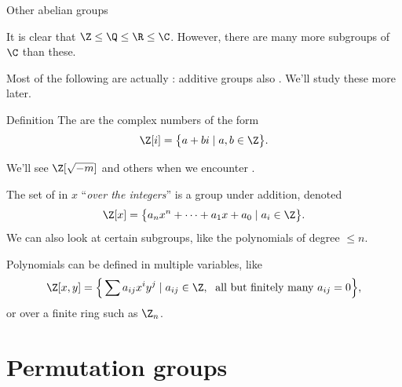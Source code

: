 \documentclass[8pt, handout]{beamer}
\newcommand{\Pause}{}
\begin{document}
\begin{frame}{Other abelian groups}
  
  It is clear that $\Z\leq\Q\leq\R\leq\C$. \Pause However, there are
  many more subgroups of $\C$ than these. \medskip\Pause

  Most of the following are actually : additive groups
  also . We'll study
  these more later. \smallskip\pause
  
  \begin{block}{Definition}
  The  are the complex numbers of the form
  \[
  \Z[i]=\big\{a+bi\mid a,b\in\Z\big\}.
  \]
  \end{block}

  \smallskip\Pause
  
  We'll see $\Z[\sqrt{-m}]$ and others when we encounter .  \medskip\pause

  The set of  in $x$ ``\emph{over the integers}'' is a
  group under addition, denoted
  \[
  \Z[x]=\big\{a_nx^n+\cdots+a_1x+a_0\mid a_i\in\Z\big\}.
  \]
  \Pause We can also look at certain subgroups, like the polynomials of degree
  $\leq n$.

  \medskip\pause
  
  Polynomials can be defined in multiple variables, like
  \[
  \Z[x,y]=\Big\{\sum a_{ij}x^iy^j\mid a_{ij}\in\Z,\;\text{ all but
    finitely many $a_{ij}=0$}\Big\},
  \]
  or over a finite ring such as $\Z_n$.
  
\end{frame}

\section{Permutation groups}

\end{document}
